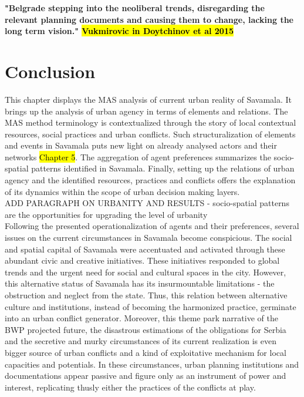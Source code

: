\documentclass[11pt]{report}
\begin{document}
\textbf{"Belgrade stepping into the neoliberal trends, disregarding the relevant planning documents and causing them to change, lacking the long term vision." \hl{Vukmirovic in Doytchinov et al 2015}}

\section{Conclusion}

This chapter displays the MAS analysis of current urban reality of Savamala.
It brings up the analysis of urban agency in terms of elements and relations. The MAS method terminology is contextualized through the story of local contextual resources, social practices and urban conflicts. Such structuralization of elements and events in Savamala puts new light on already analysed actors and their networks \hl{Chapter 5}. The aggregation of agent preferences summarizes the socio-spatial patterns identified in Savamala. Finally, setting up the relations of urban agency and the identified resources, practices and conflicts offers the explanation of its dynamics within the scope of urban decision making layers.
\\
ADD PARAGRAPH ON URBANITY AND RESULTS - socio-spatial patterns are the opportunities for upgrading the level of urbanity
\\
Following the presented operationalization of agents and their preferences, several issues on the current circumstances in Savamala become conspicious.
The social and spatial capital of Savamala were accentuated and activated through these abundant civic and creative initiatives. These initiatives responded to global trends and the urgent need for social and cultural spaces in the city. However, this alternative status of Savamala has its insurmountable limitations - the obstruction and neglect from the state. Thus, this relation between alternative culture and institutions, instead of becoming the harmonized practice, germinate into an urban conflict generator.
Moreover, this theme park narrative of the BWP projected future, the disastrous estimations of the obligations for Serbia and the secretive and murky circumstances of its current realization is even bigger source of urban conflicts and a kind of exploitative mechanism for local capacities and potentials.
In these circumstances, urban planning institutions and documentations appear passive and figure only as an instrument of power and interest, replicating thusly either the practices of the conflicts at play.
\\
\end{document}
